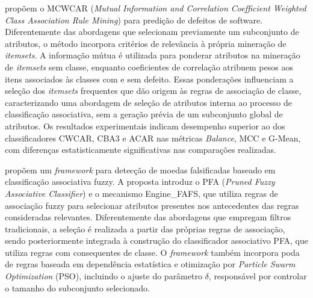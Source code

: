  propõem o MCWCAR (\textit{Mutual Information and Correlation Coefficient Weighted Class Association Rule Mining}) para predição de defeitos de software. Diferentemente das abordagens que selecionam previamente um subconjunto de atributos, o método incorpora critérios de relevância à própria mineração de \textit{itemsets}. A informação mútua é utilizada para ponderar atributos na mineração de \textit{itemsets} sem classe, enquanto coeficientes de correlação atribuem pesos aos itens associados às classes com e sem defeito. Essas ponderações influenciam a seleção dos \textit{itemsets} frequentes que dão origem às regras de associação de classe, caracterizando uma abordagem de seleção de atributos interna ao processo de classificação associativa, sem a geração prévia de um subconjunto global de atributos. Os resultados experimentais indicam desempenho superior ao dos classificadores CWCAR, CBA3 e ACAR nas métricas \textit{Balance}, MCC e G-Mean, com diferenças estatisticamente significativas nas comparações realizadas.

 propõem um \textit{framework} para detecção de moedas falsificadas baseado em classificação associativa fuzzy. A proposta introduz o PFA (\textit{Pruned Fuzzy Associative Classifier}) e o mecanismo Engine\_FAFS, que utiliza regras de associação fuzzy para selecionar atributos presentes nos antecedentes das regras consideradas relevantes. Diferentemente das abordagens que empregam filtros tradicionais, a seleção é realizada a partir das próprias regras de associação, sendo posteriormente integrada à construção do classificador associativo PFA, que utiliza regras com consequentes de classe. O \textit{framework} também incorpora poda de regras baseada em dependência estatística e otimização por \textit{Particle Swarm Optimization} (PSO), incluindo o ajuste do parâmetro $\delta$, responsável por controlar o tamanho do subconjunto selecionado.

